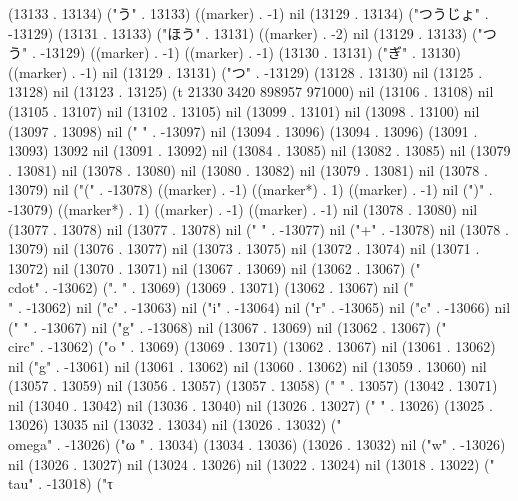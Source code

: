 (13133 . 13134) ("う" . 13133) ((marker) . -1) nil (13129 . 13134) ("つうじょ" . -13129) (13131 . 13133) ("ほう" . 13131) ((marker) . -2) nil (13129 . 13133) ("つう" . -13129) ((marker) . -1) ((marker) . -1) (13130 . 13131) ("ぎ" . 13130) ((marker) . -1) nil (13129 . 13131) ("つ" . -13129) (13128 . 13130) nil (13125 . 13128) nil (13123 . 13125) (t 21330 3420 898957 971000) nil (13106 . 13108) nil (13105 . 13107) nil (13102 . 13105) nil (13099 . 13101) nil (13098 . 13100) nil (13097 . 13098) nil (" " . -13097) nil (13094 . 13096) (13094 . 13096) (13091 . 13093) 13092 nil (13091 . 13092) nil (13084 . 13085) nil (13082 . 13085) nil (13079 . 13081) nil (13078 . 13080) nil (13080 . 13082) nil (13079 . 13081) nil (13078 . 13079) nil ("(" . -13078) ((marker) . -1) ((marker*) . 1) ((marker) . -1) nil (")" . -13079) ((marker*) . 1) ((marker) . -1) ((marker) . -1) nil (13078 . 13080) nil (13077 . 13078) nil (13077 . 13078) nil ("
" . -13077) nil ("+" . -13078) nil (13078 . 13079) nil (13076 . 13077) nil (13073 . 13075) nil (13072 . 13074) nil (13071 . 13072) nil (13070 . 13071) nil (13067 . 13069) nil (13062 . 13067) ("\\cdot" . -13062) (".
" . 13069) (13069 . 13071) (13062 . 13067) nil ("\\" . -13062) nil ("c" . -13063) nil ("i" . -13064) nil ("r" . -13065) nil ("c" . -13066) nil (" " . -13067) nil ("g" . -13068) nil (13067 . 13069) nil (13062 . 13067) ("\\circ" . -13062) ("o
" . 13069) (13069 . 13071) (13062 . 13067) nil (13061 . 13062) nil ("g" . -13061) nil (13061 . 13062) nil (13060 . 13062) nil (13059 . 13060) nil (13057 . 13059) nil (13056 . 13057) (13057 . 13058) ("  " . 13057) (13042 . 13071) nil (13040 . 13042) nil (13036 . 13040) nil (13026 . 13027) (" " . 13026) (13025 . 13026) 13035 nil (13032 . 13034) nil (13026 . 13032) ("\\omega" . -13026) ("ω
" . 13034) (13034 . 13036) (13026 . 13032) nil ("w" . -13026) nil (13026 . 13027) nil (13024 . 13026) nil (13022 . 13024) nil (13018 . 13022) ("\\tau" . -13018) ("τ
